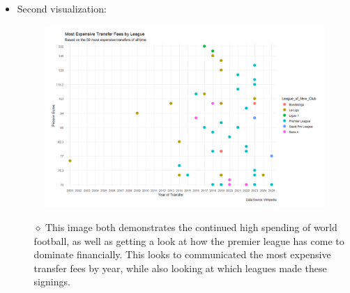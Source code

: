 \documentclass[12pt,letterpaper]{article}
\begin{document}
\begin{itemize}
    \item Second visualization:
        \begin{figure}[h!]  
            \centering
            \includegraphics[width=1\textwidth]{PS6b_Williams.png}
        \end{figure}
            \begin{itemize}
            \item[$\diamond$] This image both demonstrates the continued high spending of world football, as well as getting a look at how the premier league has come to dominate financially. This looks to communicated the most expensive transfer fees by year, while also looking at which leagues made these signings. 
             \end{itemize}
\end{itemize}
\newpage
\vspace*{2cm}
\end{document}
